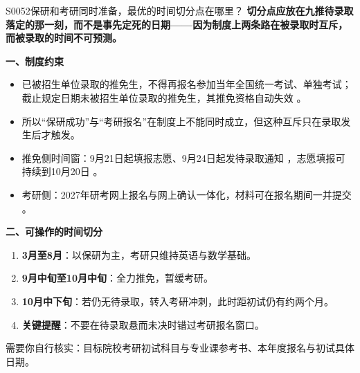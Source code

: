 \begin{qa}{S0052}{保研和考研同时准备，最优的时间切分点在哪里？}
\textbf{切分点应放在九推待录取落定的那一刻，而不是事先定死的日期——因为制度上两条路在被录取时互斥，而被录取的时间不可预测。}

\textbf{一、制度约束}
\begin{itemize}
  \item 已被招生单位录取的推免生，不得再报名参加当年全国统一考试、单独考试；截止规定日期未被招生单位录取的推免生，其推免资格自动失效 。
  \item 所以“保研成功”与“考研报名”在制度上不能同时成立，但这种互斥只在录取发生后才触发。
  \item 推免侧时间窗：9月21日起填报志愿、9月24日起发待录取通知 ，志愿填报可持续到10月20日 。
  \item 考研侧：2027年研考网上报名与网上确认一体化，材料可在报名期间一并提交 。
\end{itemize}

\textbf{二、可操作的时间切分}
\begin{enumerate}
  \item \textbf{3月至8月}：以保研为主，考研只维持英语与数学基础。
  \item \textbf{9月中旬至10月中旬}：全力推免，暂缓考研。
  \item \textbf{10月中下旬}：若仍无待录取，转入考研冲刺，此时距初试仍有约两个月。
  \item \textbf{关键提醒}：不要在待录取悬而未决时错过考研报名窗口。
\end{enumerate}

需要你自行核实：目标院校考研初试科目与专业课参考书、本年度报名与初试具体日期。
\end{qa}


